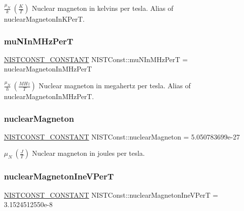 $\frac{\mu_N}{k} \ (\frac{K}{T})$ Nuclear magneton in kelvins per tesla. Alias of nuclear\+Magneton\+In\+K\+PerT. \mbox{\label{group___n_i_s_t_const-_nuclear_magneton_gaa05aa79a9968b213a14c4c6f41c27d1b}} 
\subsubsection{\texorpdfstring{mu\+N\+In\+M\+Hz\+PerT}{muNInMHzPerT}}
{\footnotesize\ttfamily \mbox{\hyperlink{group___n_i_s_t_const-_macros_ga2b0fc1d7452373f816175dd86ce26729}{N\+I\+S\+T\+C\+O\+N\+S\+T\+\_\+\+C\+O\+N\+S\+T\+A\+NT}} N\+I\+S\+T\+Const\+::mu\+N\+In\+M\+Hz\+PerT = nuclear\+Magneton\+In\+M\+Hz\+PerT}

$\frac{\mu_N}{h} \ (\frac{MHz}{T})$ Nuclear magneton in megahertz per tesla. Alias of nuclear\+Magneton\+In\+M\+Hz\+PerT. \mbox{\label{group___n_i_s_t_const-_nuclear_magneton_ga7772e88568bba00c23575dcbe1e8b4da}} 
\subsubsection{\texorpdfstring{nuclear\+Magneton}{nuclearMagneton}}
{\footnotesize\ttfamily \mbox{\hyperlink{group___n_i_s_t_const-_macros_ga2b0fc1d7452373f816175dd86ce26729}{N\+I\+S\+T\+C\+O\+N\+S\+T\+\_\+\+C\+O\+N\+S\+T\+A\+NT}} N\+I\+S\+T\+Const\+::nuclear\+Magneton = 5.\+050783699e-\/27}

$\mu_N \ (\frac{J}{T})$ Nuclear magneton in joules per tesla. \mbox{\label{group___n_i_s_t_const-_nuclear_magneton_gaac4f73b042846dbd18c8e86bf7ad40ad}} 
\subsubsection{\texorpdfstring{nuclear\+Magneton\+Ine\+V\+PerT}{nuclearMagnetonIneVPerT}}
{\footnotesize\ttfamily \mbox{\hyperlink{group___n_i_s_t_const-_macros_ga2b0fc1d7452373f816175dd86ce26729}{N\+I\+S\+T\+C\+O\+N\+S\+T\+\_\+\+C\+O\+N\+S\+T\+A\+NT}} N\+I\+S\+T\+Const\+::nuclear\+Magneton\+Ine\+V\+PerT = 3.\+1524512550e-\/8}


